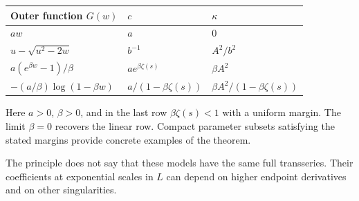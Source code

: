 \begin{center}
\begin{tabular}{@{}lll@{}}
\toprule
Outer function $G(w)$ & $c$ & $\kappa$\\
\midrule
$a w$ & $a$ & $0$\\
$u-\sqrt{u^2-2w}$ & $b^{-1}$ & $A^2/b^2$\\
$a(e^{\beta w}-1)/\beta$ & $a e^{\beta\zeta(s)}$ & $\beta A^2$\\
$-(a/\beta)\log(1-\beta w)$ & $a/(1-\beta\zeta(s))$
 & $\beta A^2/(1-\beta\zeta(s))$\\
\bottomrule
\end{tabular}
\end{center}
Here $a>0$, $\beta>0$, and in the last row
$\beta\zeta(s)<1$ with a uniform margin. The limit $\beta=0$
recovers the linear row. Compact parameter subsets satisfying the
stated margins provide concrete examples of the theorem.

The principle does not say that these models have the same full
transseries. Their coefficients at exponential scales in $L$ can
depend on higher endpoint derivatives and on other singularities.
